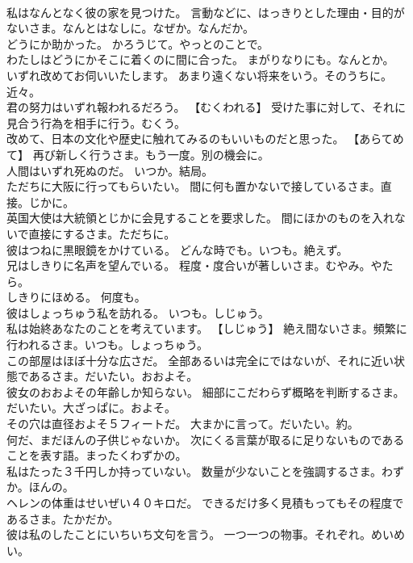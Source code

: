 \documentclass[8pt]{extreport}
\begin{document}
\begin{CJK}{UTF8}{min}
\\	私はなんとなく彼の家を見つけた。	言動などに、はっきりとした理由・目的がないさま。なんとはなしに。なぜか。なんだか。
\\	どうにか助かった。	かろうじて。やっとのことで。
\\	わたしはどうにかそこに着くのに間に合った。	まがりなりにも。なんとか。
\\	いずれ改めてお伺いいたします。	あまり遠くない将来をいう。そのうちに。近々。
\\	君の努力はいずれ報われるだろう。	【むくわれる】 受けた事に対して、それに見合う行為を相手に行う。むくう。
\\	改めて、日本の文化や歴史に触れてみるのもいいものだと思った。	【あらてめて】 再び新しく行うさま。もう一度。別の機会に。
\\	人間はいずれ死ぬのだ。	いつか。結局。
\\	ただちに大阪に行ってもらいたい。	間に何も置かないで接しているさま。直接。じかに。
\\	英国大使は大統領とじかに会見することを要求した。	間にほかのものを入れないで直接にするさま。ただちに。
\\	彼はつねに黒眼鏡をかけている。	どんな時でも。いつも。絶えず。
\\	兄はしきりに名声を望んでいる。	程度・度合いが著しいさま。むやみ。やたら。
\\	しきりにほめる。	何度も。
\\	彼はしょっちゅう私を訪れる。	いつも。しじゅう。
\\	私は始終あなたのことを考えています。	【しじゅう】 絶え間ないさま。頻繁に行われるさま。いつも。しょっちゅう。
\\	この部屋はほぼ十分な広さだ。	全部あるいは完全にではないが、それに近い状態であるさま。だいたい。おおよそ。
\\	彼女のおおよその年齢しか知らない。	細部にこだわらず概略を判断するさま。だいたい。大ざっぱに。およそ。
\\	その穴は直径およそ５フィートだ。	大まかに言って。だいたい。約。
\\	何だ、まだほんの子供じゃないか。	次にくる言葉が取るに足りないものであることを表す語。まったくわずかの。
\\	私はたった３千円しか持っていない。	数量が少ないことを強調するさま。わずか。ほんの。
\\	ヘレンの体重はせいぜい４０キロだ。	できるだけ多く見積もってもその程度であるさま。たかだか。
\\	彼は私のしたことにいちいち文句を言う。	一つ一つの物事。それぞれ。めいめい。

\end{CJK}
\end{document}
